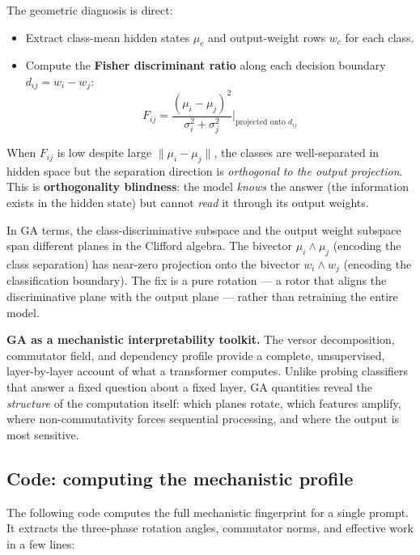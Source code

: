 \documentclass[11pt, twoside, openright]{memoir}
\newcommand{\op}{\wedge}          %
\numberwithin{equation}{chapter}
\begin{document}
The geometric diagnosis is direct:
\begin{itemize}[nosep]
\item Extract class-mean hidden states $\mu_c$ and output-weight
  rows $w_c$ for each class.
\item Compute the \textbf{Fisher discriminant ratio} along each
  decision boundary $d_{ij} = w_i - w_j$:
  \begin{equation}
    F_{ij} = \frac{(\mu_i - \mu_j)^2}{\sigma_i^2 + \sigma_j^2}
    \bigg|_{\text{projected onto } d_{ij}}
  \end{equation}
\end{itemize}
When $F_{ij}$ is low despite large $\|\mu_i - \mu_j\|$, the classes
are well-separated in hidden space but the separation direction is
\emph{orthogonal to the output projection}.  This is
\textbf{orthogonality blindness}: the model \emph{knows} the answer
(the information exists in the hidden state) but cannot \emph{read}
it through its output weights.

In GA terms, the class-discriminative subspace and the output weight
subspace span different planes in the Clifford algebra.  The bivector
$\mu_i \op \mu_j$ (encoding the class separation) has near-zero
projection onto the bivector $w_i \op w_j$ (encoding the
classification boundary).  The fix is a pure rotation --- a rotor
that aligns the discriminative plane with the output plane --- rather
than retraining the entire model.

\begin{keyidea}
\textbf{GA as a mechanistic interpretability toolkit.}  The versor
decomposition, commutator field, and dependency profile provide a
complete, unsupervised, layer-by-layer account of what a transformer
computes.  Unlike probing classifiers that answer a fixed question
about a fixed layer, GA quantities reveal the \emph{structure} of
the computation itself: which planes rotate, which features amplify,
where non-commutativity forces sequential processing, and where the
output is most sensitive.
\end{keyidea}

\subsection{Code: computing the mechanistic profile}

The following code computes the full mechanistic fingerprint for a
single prompt.  It extracts the three-phase rotation angles,
commutator norms, and effective work in a few lines:
\end{document}

